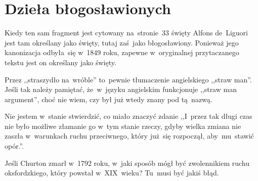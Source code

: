 \documentclass[a4paper,11pt]{article}
\begin{document}
\vspace{\spaceTwo}










\newpage
\section{Dzieła błogosławionych}

\vspace{\spaceTwo}






\start {} Kiedy ten sam fragment jest cytowany
na~stronie~33 święty Alfons de~Liguori jest tam określany jako święty,
tutaj zaś~jako błogosławiony. Ponieważ jego kanonizacja odbyła~się
w~1849 roku, zapewne w~oryginalnej przytaczanego tekstu jest on
określany jako święty.

\vspace{\spaceFour}


\start {} Przez ,,straszydło na~wróble'' to~pewnie
tłumaczenie angielskiego ,,straw man''. Jeśli tak należy pamiętać,
że~w~języku angielskim funkcjonuje ,,straw man argument'', choć nie
wiem, czy był już wtedy znany pod tą~nazwą.

\vspace{\spaceFour}


\start {} Nie jestem w~stanie stwierdzić, co miało znaczyć
zdanie ,,I~przez tak długi czas nie było możliwe złamanie go w~tym
stanie rzeczy, gdyby wielka zmiana nie zaszła w~warunkach ruchu
przeciwnego, który już~się rozpoczął, aby~mu~stawić opór.''.

\vspace{\spaceFour}


\start {} Jeśli Churton zmarł w~1792 roku, w~jaki sposób
mógł być zwolennikiem ruchu oksfordzkiego, który powstał w~XIX~wieku?
Tu~musi być jakiś błąd.

\vspace{\spaceFour}
\end{document}
